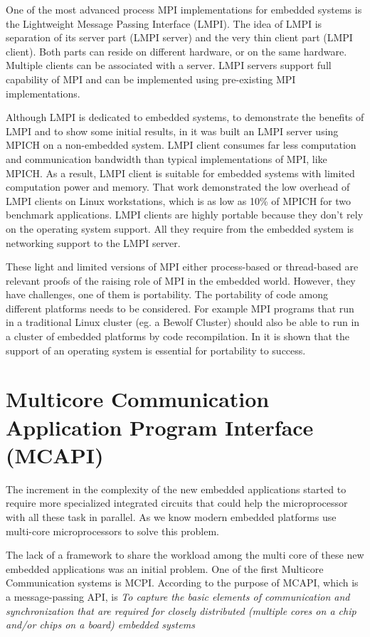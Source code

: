 One of the most advanced process MPI implementations for embedded systems is
the Lightweight Message Passing Interface (LMPI)\cite{Abgaria}. The idea of
LMPI is separation of its server part (LMPI server) and the very thin client
part (LMPI client). Both parts can reside on different hardware, or on the same
hardware. Multiple clients can be associated with a server. LMPI servers
support full capability of MPI and can be implemented using pre-existing MPI
implementations. 

Although LMPI is dedicated to embedded systems, to demonstrate the benefits of
LMPI and to show some initial results, in \cite{Abgaria} it was  built an LMPI
server using MPICH on a non-embedded system. LMPI client consumes far less
computation and communication bandwidth than typical implementations of MPI,
like MPICH.  As a result, LMPI client is suitable for embedded systems with
limited computation power and memory. That work demonstrated the low overhead
of LMPI clients on Linux workstations, which is as low as 10\% of MPICH for two
benchmark applications.  LMPI clients are highly portable because they don't
rely on the operating system support. All they require from the embedded system
is networking support to the LMPI server.

These light and limited versions of MPI either process-based or thread-based
are relevant proofs of the raising role of MPI in the embedded world. However,
they have challenges, one of them is portability. The portability of code among
different platforms needs to be considered. For example MPI programs that run
in a traditional Linux cluster (eg. a Bewolf Cluster) should also be able to
run in a cluster of embedded platforms  by code recompilation.  In
\cite{Gallego} it is shown that the support of an operating system is essential
for portability to success.

\section{Multicore Communication Application Program Interface (MCAPI)}

The increment in the complexity of the new embedded applications started to
require more specialized integrated circuits that could help the microprocessor
with all these task in parallel. As we know modern embedded platforms use
multi-core microprocessors to solve this problem.

The lack of a framework to share the workload among the multi core of these new embedded
applications was an initial problem. One of the first Multicore Communication systems is MCPI.
According to \cite{MCAPI} the purpose of MCAPI, which is a message-passing API,
is \textit{To capture the basic elements of communication and synchronization
that are required for closely distributed (multiple cores on a chip and/or
chips on a board) embedded systems} 


